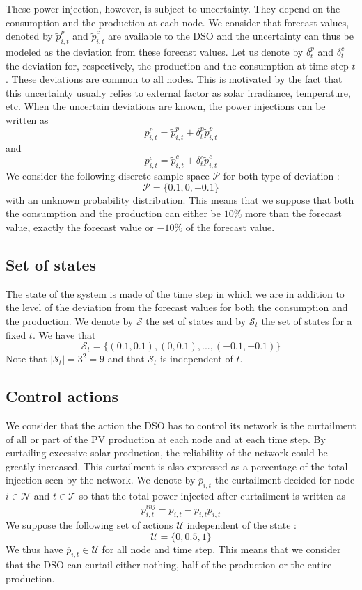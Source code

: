 These power injection, however, is subject to uncertainty.
They depend on the consumption and the production at each node.
We consider that forecast values, denoted by $\tilde{p}_{i,t}^p$ and $\tilde{p}_{i,t}^c$ are available to the DSO and the uncertainty can thus be modeled as the deviation from these forecast values.
Let us denote by $\delta_t^p$ and $\delta_t^c$ the deviation for, respectively, the production and the consumption at time step $t$.
These deviations are common to all nodes.
This is motivated by the fact that this uncertainty usually relies to external factor as solar irradiance, temperature, etc.
When the uncertain deviations are known, the power injections can be written as
\[
   p_{i,t}^p = \tilde{p}_{i,t}^p + \delta_t^p\tilde{p}_{i,t}^p
  \]
and
\[
   p_{i,t}^c = \tilde{p}_{i,t}^c + \delta_t^c\tilde{p}_{i,t}^c
  \]
We consider the following discrete sample space $\mathcal{P}$ for both type of deviation :
\[
  \mathcal{P} = \{0.1, 0, -0.1\}
\]
with an unknown probability distribution.
This means that we suppose that both the consumption and the production can either be $10\%$ more than the forecast value, exactly the forecast value or $-10\%$ of the forecast value.

\subsection{Set of states}

The state of the system is made of the time step in which we are in addition to the level of the deviation from the forecast values for both the consumption and the production.
We denote by $\mathcal{S}$ the set of states and by $\mathcal{S}_t$ the set of states for a fixed $t$.
We have that
\[
  \mathcal{S}_t = \{(0.1, 0.1), (0, 0.1), ..., (-0.1, -0.1)\}
\]
Note that $|\mathcal{S}_t| = 3^2 = 9$ and that $\mathcal{S}_t$ is independent of $t$.

\subsection{Control actions}

We consider that the action the DSO has to control its network is the curtailment of all or part of the PV production at each node and at each time step.
By curtailing excessive solar production, the reliability of the network could be greatly increased.
This curtailment is also expressed as a percentage of the total injection seen by the network.
We denote by $\overline{p}_{i,t}$ the curtailment decided for node $i \in \mathcal{N}$ and $t \in \mathcal{T}$ so that the total power injected after curtailment is written as
\[
  p^{inj}_{i,t} = p_{i,t} - \overline{p}_{i,t}p_{i,t}
\]
We suppose the following set of actions $\mathcal{U}$ independent of the state :
\[
  \mathcal{U} = \{0, 0.5, 1\}
\]
We thus have $\overline{p}_{i,t} \in \mathcal{U}$ for all node and time step.
This means that we consider that the DSO can curtail either nothing, half of the production or the entire production.

